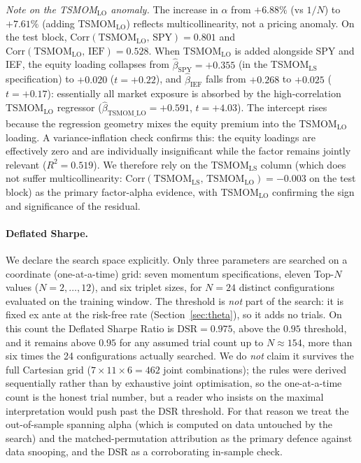 \begin{table}[H]
\begin{flushleft}
\smallskip
\emph{Note on the TSMOM$_{\text{LO}}$ anomaly.}
The increase in $\alpha$ from $+6.88\%$ (vs $1/N$) to $+7.61\%$ (adding
TSMOM$_{\text{LO}}$) reflects multicollinearity, not a pricing anomaly.
On the test block, $\text{Corr}(\text{TSMOM}_{\text{LO}},\,\text{SPY}) = 0.801$
and $\text{Corr}(\text{TSMOM}_{\text{LO}},\,\text{IEF}) = 0.528$.
When TSMOM$_{\text{LO}}$ is added alongside SPY and IEF, the equity loading
collapses from $\hat\beta_{\text{SPY}} = +0.355$ (in the TSMOM$_{\text{LS}}$
specification) to $+0.020$ ($t = +0.22$), and $\hat\beta_{\text{IEF}}$ falls
from $+0.268$ to $+0.025$ ($t = +0.17$): essentially all market exposure is
absorbed by the high-correlation TSMOM$_{\text{LO}}$ regressor
($\hat\beta_{\text{TSMOM\_LO}} = +0.591$, $t = +4.03$).
The intercept rises because the regression geometry mixes the equity premium
into the TSMOM$_{\text{LO}}$ loading. A variance-inflation check confirms this:
the equity loadings are effectively zero and are individually insignificant while
the factor remains jointly relevant ($R^2 = 0.519$). We therefore rely on the
TSMOM$_{\text{LS}}$ column (which does not suffer multicollinearity:
$\text{Corr}(\text{TSMOM}_{\text{LS}},\,\text{TSMOM}_{\text{LO}}) = -0.003$
on the test block) as the primary factor-alpha evidence, with TSMOM$_{\text{LO}}$
confirming the sign and significance of the residual.
\end{flushleft}
\end{table}


\paragraph{Deflated Sharpe.}
We declare the search space explicitly. Only three parameters are searched on a
coordinate (one-at-a-time) grid: seven momentum specifications, eleven Top-$N$ values
($N = 2,\ldots,12$), and six triplet sizes, for $N = 24$ distinct configurations
evaluated on the training window. The threshold is \emph{not} part of the search: it
is fixed ex ante at the risk-free rate (Section~\ref{sec:theta}), so it adds no
trials. On this count the \citet{bailey2014} Deflated Sharpe Ratio is
$\mathrm{DSR} = 0.975$, above the $0.95$ threshold, and it remains above $0.95$ for
any assumed trial count up to $N \approx 154$, more than six times the 24
configurations actually searched. We do \emph{not} claim it survives the full
Cartesian grid ($7 \times 11 \times 6 = 462$ joint combinations); the rules were
derived sequentially rather than by exhaustive joint optimisation, so the
one-at-a-time count is the honest trial number, but a reader who insists on the
maximal interpretation would push past the DSR threshold. For that reason we treat
the out-of-sample spanning alpha (which is computed on data untouched by the search)
and the matched-permutation attribution as the primary defence against data
snooping, and the DSR as a corroborating in-sample check.

